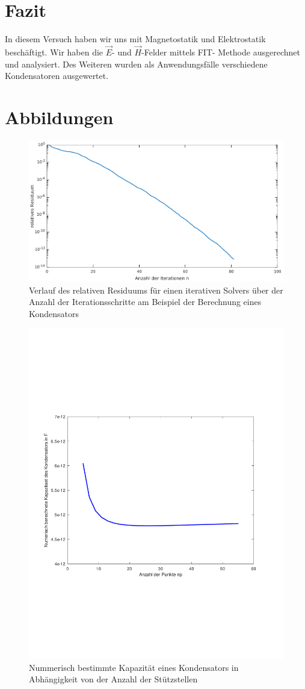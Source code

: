 \documentclass[Protokollheft.tex]{subfiles}
\begin{document}
\section{Fazit}
In diesem Versuch haben wir uns mit Magnetostatik und Elektrostatik beschäftigt. Wir haben die $\vec{E}$- und $\vec{H}$-Felder mittels FIT- Methode ausgerechnet und analysiert. Des Weiteren wurden als Anwendungsfälle verschiedene Kondensatoren ausgewertet.

\clearpage
\newpage
\section{Abbildungen}
\begin{figure}[h!]
	\centering
	\includegraphics[width=0.7\linewidth]{ResidiumIterationenGraph.pdf}
	\caption{Verlauf des relativen Residuums für einen iterativen Solvers über der Anzahl der Iterationsschritte am Beispiel der Berechnung eines Kondensators}
	\label{fig:residiumiIterationen}
\end{figure}

\begin{figure}[h!]
	\centering
	\includegraphics[trim = 10mm 65mm 20mm 70mm, clip,width=0.7\linewidth]{KapazitaetUeberAnzStuetzstellen.pdf}
	\caption{Nummerisch bestimmte Kapazität eines Kondensators in Abhängigkeit von der Anzahl der Stützstellen}
	\label{fig:kapazitaetueberanzstuetzstellen}
\end{figure}
\end{document}
